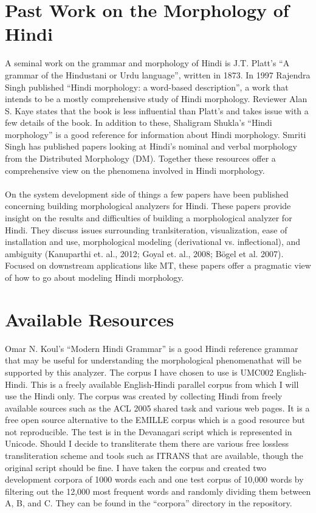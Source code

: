 \documentclass[11pt,letterpaper]{article}
\begin{document}
\section{Past Work on the Morphology of Hindi}
A seminal work on the grammar and morphology of Hindi is J.T. Platt's ``A grammar of the Hindustani or Urdu language'', written in 1873. In 1997 Rajendra Singh published ``Hindi morphology: a word-based description'', a work that intends to be a mostly comprehensive study of Hindi morphology. Reviewer Alan S. Kaye states that the book is less influential than Platt's and takes issue with a few details of the book. In addition to these, Shaligram Shukla's ``Hindi morphology'' is a good reference for information about Hindi morphology. Smriti Singh has published papers looking at Hindi's nominal and verbal morphology from the Distributed Morphology (DM). Together these resources offer a comprehensive view on the phenomena involved in Hindi morphology.\\
\\
On the system development side of things a few papers have been published concerning building morphological analyzers for Hindi. These papers provide insight on the results and difficulties of building a morphological analyzer for Hindi. They discuss issues surrounding tranlsiteration, visualization, ease of installation and use, morphological modeling (derivational vs. inflectional), and ambiguity (Kanuparthi et. al., 2012; Goyal et. al., 2008; Bögel et al. 2007). Focused on downstream applications like MT, these papers offer a pragmatic view of how to go about modeling Hindi morphology. \\
\section{Available Resources}
Omar N. Koul's ``Modern Hindi Grammar'' is a good Hindi reference grammar that may be useful for understanding the morphological phenomenathat will be supported by this analyzer.
The corpus I have chosen to use is UMC002 English-Hindi. This is a freely available English-Hindi parallel corpus from which I will use the Hindi only. The corpus was created by collecting Hindi from freely available sources such as the ACL 2005 shared task and various web pages. It is a free open source alternative to the EMILLE corpus which is a good resource but not reproducible. The test is in the Devanagari script which is represented in Unicode. Should I decide to transliterate them there are various free lossless transliteration scheme and tools such as ITRANS that are available, though the original script should be fine. I have taken the corpus and created two development corpora of 1000 words each and one test corpus of 10,000 words by filtering out the 12,000 most frequent words and randomly dividing them between A, B, and C. They can be found in the ``corpora'' directory in the repository.
\end{document}
